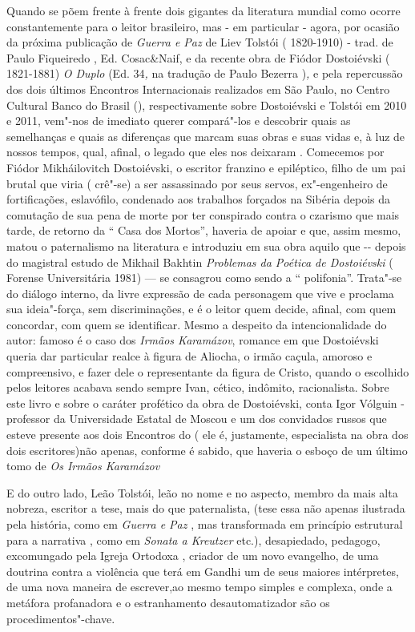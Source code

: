 Quando se põem frente à frente dois gigantes da literatura mundial como
ocorre constantemente para o leitor brasileiro, mas - em particular -
agora, por ocasião da próxima publicação de \emph{Guerra e Paz} de Liev
Tolstói ( 1820-1910) - trad. de Paulo Fiqueiredo , Ed. Cosac\&Naif, e da
recente obra de Fiódor Dostoiévski ( 1821-1881) \emph{O Duplo} (Ed.
34\emph{,} na tradução de Paulo Bezerra )\emph{,} e pela repercussão dos
dois últimos Encontros Internacionais realizados em São Paulo, no Centro
Cultural Banco do Brasil (), respectivamente sobre Dostoiévski e
Tolstói em 2010 e 2011, vem"-nos de imediato querer compará"-los e
descobrir quais as semelhanças e quais as diferenças que marcam suas
obras e suas vidas e, à luz de nossos tempos, qual, afinal, o legado que
eles nos deixaram . Comecemos por Fiódor Mikháilovitch Dostoiévski, o
escritor franzino e epiléptico, filho de um pai brutal que viria (
crê"-se) a ser assassinado por seus servos, ex"-engenheiro de
fortificações, eslavófilo, condenado aos trabalhos forçados na Sibéria
depois da comutação de sua pena de morte por ter conspirado contra o
czarismo que mais tarde, de retorno da `` Casa dos Mortos'', haveria de
apoiar e que, assim mesmo, matou o paternalismo na literatura e
introduziu em sua obra aquilo que -\/- depois do magistral estudo de
Mikhail Bakhtin \emph{Problemas da Poética de Dostoiévski} ( Forense
Universitária 1981) --- se consagrou como sendo a `` polifonia''.
Trata"-se do diálogo interno, da livre expressão de cada personagem que
vive e proclama sua ideia"-força, sem discriminações, e é o leitor quem
decide, afinal, com quem concordar, com quem se identificar. Mesmo a
despeito da intencionalidade do autor: famoso é o caso dos \emph{Irmãos
Karamázov}, romance em que Dostoiévski queria dar particular realce à
figura de Aliocha, o irmão caçula, amoroso e compreensivo, e fazer dele
o representante da figura de Cristo, quando o escolhido pelos leitores
acabava sendo sempre Ivan, cético, indômito, racionalista. Sobre este
livro e sobre o caráter profético da obra de Dostoiévski, conta Igor
Vólguin - professor da Universidade Estatal de Moscou e um dos
convidados russos que esteve presente aos dois Encontros do  ( ele é, justamente, especialista na obra dos dois escritores)não apenas,
conforme é sabido, que haveria o esboço de um último tomo de \emph{Os
Irmãos Karamázov}

E do outro lado, Leão Tolstói, leão no nome e no aspecto, membro da mais
alta nobreza, escritor a tese, mais do que paternalista, (tese essa não
apenas ilustrada pela história, como em \emph{Guerra e Paz} , mas
transformada em princípio estrutural para a narrativa , como em
\emph{Sonata a Kreutzer} etc.), desapiedado, pedagogo, excomungado pela
Igreja Ortodoxa , criador de um novo evangelho, de uma doutrina contra a
violência que terá em Gandhi um de seus maiores intérpretes, de uma nova
maneira de escrever,ao mesmo tempo simples e complexa, onde a metáfora
profanadora e o estranhamento desautomatizador são os
procedimentos"-chave.


